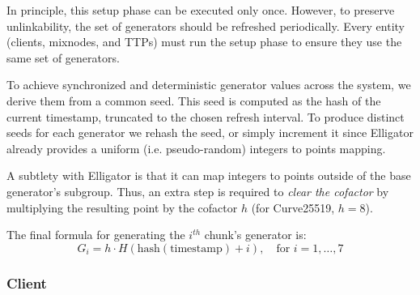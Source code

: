 In principle, this setup phase can be executed only once. 
However, to preserve unlinkability, the set of generators should be refreshed periodically. 
Every entity (clients, mixnodes, and TTPs) must run the setup phase to ensure they use the same set of generators.

To achieve synchronized and deterministic generator values across the system, we derive them from a common seed. 
This seed is computed as the hash of the current timestamp, truncated to the chosen refresh interval. 
To produce distinct seeds for each generator we rehash the seed, or simply increment it since Elligator already provides a uniform (i.e. pseudo-random) integers to points mapping.

A subtlety with Elligator is that it can map integers to points outside of the base generator's subgroup.
Thus, an extra step is required to \textit{clear the cofactor} by multiplying the resulting point by the cofactor $ h $ (for Curve25519, $ h = 8 $).

\noindent The final formula for generating the $ i^{th} $ chunk’s generator is:
$$
G_i = h \cdot H(\text{hash}(\text{timestamp}) + i), \quad \text{for } i = 1, \dots, 7
$$


\subsubsection{Client}
  
